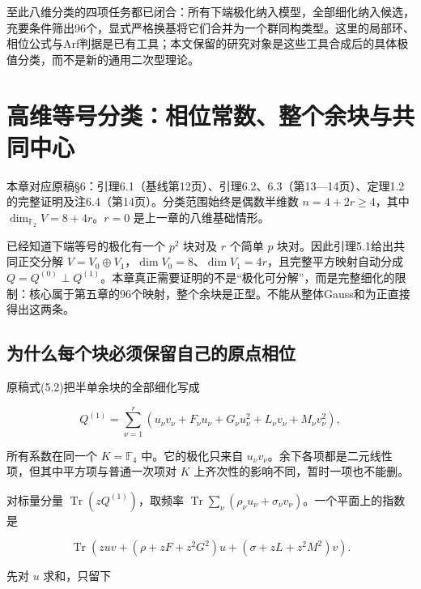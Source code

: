\documentclass[UTF8,fontset=fandol,zihao=-4,openany,oneside]{ctexbook}
\begin{document}
至此八维分类的四项任务都已闭合：所有下端极化纳入模型，全部细化纳入候选，充要条件筛出96个，显式严格换基将它们合并为一个群同构类型。这里的局部环、相位公式与Arf判据是已有工具；本文保留的研究对象是这些工具合成后的具体极值分类，而不是新的通用二次型理论。



\chapter{高维等号分类：相位常数、整个余块与共同中心}


本章对应原稿§6：引理6.1（基线第12页）、引理6.2、6.3（第13—14页）、定理1.2的完整证明及注6.4（第14页）。分类范围始终是偶数半维数 \(n=4+2r\ge4\)，其中 \(\dim_{\mathbb F_2}V=8+4r\)。\(r=0\) 是上一章的八维基础情形。



已经知道下端等号的极化有一个 \(p^2\) 块对及 \(r\) 个简单 \(p\) 块对。因此引理5.1给出共同正交分解 \(V=V_0\oplus V_1\)，\(\dim V_0=8\)、\(\dim V_1=4r\)，且完整平方映射自动分成 \(Q=Q^{(0)}\perp Q^{(1)}\)。本章真正需要证明的不是“极化可分解”，而是完整细化的限制：核心属于第五章的96个映射，整个余块是正型。不能从整体Gauss和为正直接得出这两条。



\section{为什么每个块必须保留自己的原点相位}


原稿式(5.2)把半单余块的全部细化写成



\[
Q^{(1)}=\sum_{\nu=1}^r
\left(u_\nu v_\nu+F_\nu u_\nu+G_\nu u_\nu^2
+L_\nu v_\nu+M_\nu v_\nu^2\right),
\]



所有系数在同一个 \(K=\mathbb F_4\) 中。它的极化只来自 \(u_\nu v_\nu\)。余下各项都是二元线性项，但其中平方项与普通一次项对 \(K\) 上齐次性的影响不同，暂时一项也不能删。



对标量分量 \(\operatorname{Tr}(zQ^{(1)})\)，取频率 \(\operatorname{Tr}\sum_\nu(\rho_\nu u_\nu+\sigma_\nu v_\nu)\)。一个平面上的指数是



\[
\operatorname{Tr}\left(
zuv+(\rho+zF+z^2G^2)u+(\sigma+zL+z^2M^2)v\right).
\]



先对 \(u\) 求和，只留下
\end{document}
